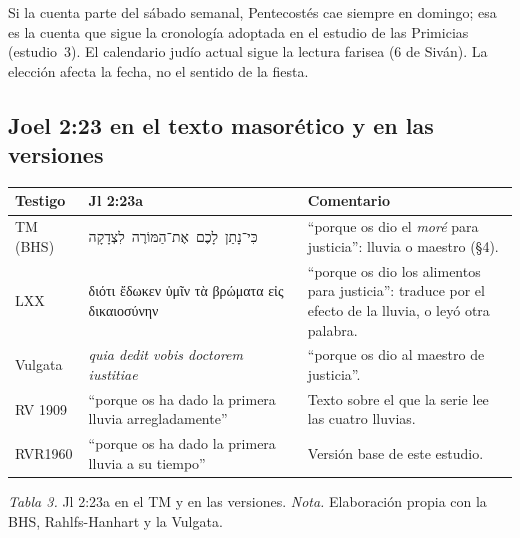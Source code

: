 \documentclass[11pt,letterpaper]{article}
\newcommand{\heb}[1]{\mbox{\foreignlanguage{hebrew}{#1}}}
\newcommand{\grc}[1]{\foreignlanguage{ancientgreek}{#1}}
\begin{document}
\begin{nota}[Precisión]
Si la cuenta parte del sábado semanal, Pentecostés cae siempre en domingo; esa es la cuenta que sigue la cronología adoptada en el estudio de las Primicias (estudio~3). El calendario judío actual sigue la lectura farisea (6 de Siván). La elección afecta la fecha, no el sentido de la fiesta.
\end{nota}

\subsection{Joel 2:23 en el texto masorético y en las versiones}

\begin{center}\small\renewcommand{\arraystretch}{1.22}
\begin{tabular}{@{}L{2.4cm}L{6.2cm}L{6.8cm}@{}}
\toprule
\textbf{Testigo} & \textbf{Jl 2:23a} & \textbf{Comentario} \\ \midrule
TM (BHS) & \heb{כִּי־נָתַן לָכֶם אֶת־הַמּוֹרֶה לִצְדָקָה} & ``porque os dio el \emph{moré} para justicia'': lluvia o maestro (§4). \\
LXX & \grc{διότι ἔδωκεν ὑμῖν τὰ βρώματα εἰς δικαιοσύνην} & ``porque os dio los alimentos para justicia'': traduce por el efecto de la lluvia, o leyó otra palabra. \\
Vulgata & \emph{quia dedit vobis doctorem iustitiae} & ``porque os dio al maestro de justicia''. \\
RV 1909 & ``porque os ha dado la primera lluvia arregladamente'' & Texto sobre el que la serie lee las cuatro lluvias. \\
RVR1960 & ``porque os ha dado la primera lluvia a su tiempo'' & Versión base de este estudio. \\
\bottomrule
\end{tabular}\par
{\footnotesize\color{sepia}\textit{Tabla 3.} Jl 2:23a en el TM y en las versiones. \textit{Nota.} Elaboración propia con la BHS, Rahlfs-Hanhart y la Vulgata.}
\end{center}
\end{document}
